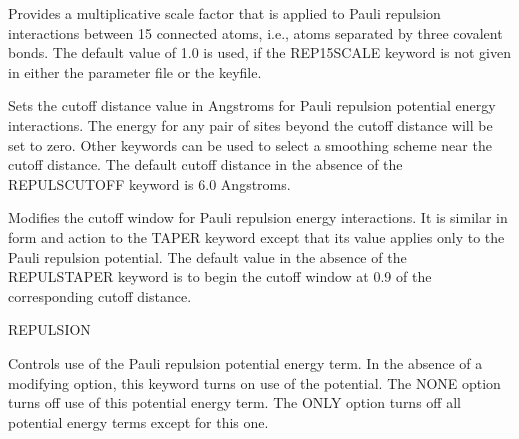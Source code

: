 \documentclass[letterpaper,11pt,english]{sphinxmanual}
\begin{document}
\ignorespaces {}\label{\detokenize{text/keywords:key-rep-15-scale}}\begin{description}
\sphinxAtStartPar
Provides a multiplicative scale factor that is applied to Pauli repulsion interactions between 1\sphinxhyphen{}5 connected atoms, i.e., atoms separated by three covalent bonds. The default value of 1.0 is used, if the REP\sphinxhyphen{}15\sphinxhyphen{}SCALE keyword is not given in either the parameter file or the keyfile.

\end{description}

\ignorespaces {}\label{\detokenize{text/keywords:key-repuls-cutoff}}\begin{description}
\sphinxAtStartPar
Sets the cutoff distance value in Angstroms for Pauli repulsion potential energy interactions. The energy for any pair of sites beyond the cutoff distance will be set to zero. Other keywords can be used to select a smoothing scheme near the cutoff distance. The default cutoff distance in the absence of the REPULS\sphinxhyphen{}CUTOFF keyword is 6.0 Angstroms.

\end{description}

\ignorespaces {}\label{\detokenize{text/keywords:key-repuls-taper}}\begin{description}
\sphinxAtStartPar
Modifies the cutoff window for Pauli repulsion energy interactions. It is similar in form and action to the TAPER keyword except that its value applies only to the Pauli repulsion potential. The default value in the absence of the REPULS\sphinxhyphen{}TAPER keyword is to begin the cutoff window at 0.9 of the corresponding cutoff distance.

\end{description}

\ignorespaces {}\label{\detokenize{text/keywords:key-repulsion}}
\sphinxAtStartPar
REPULSION

\ignorespaces {}\label{\detokenize{text/keywords:key-repulsionterm}}\begin{description}
\sphinxAtStartPar
Controls use of the Pauli repulsion potential energy term. In the absence of a modifying option, this keyword turns on use of the potential. The NONE option turns off use of this potential energy term. The ONLY option turns off all potential energy terms except for this one.

\end{description}
\end{document}
